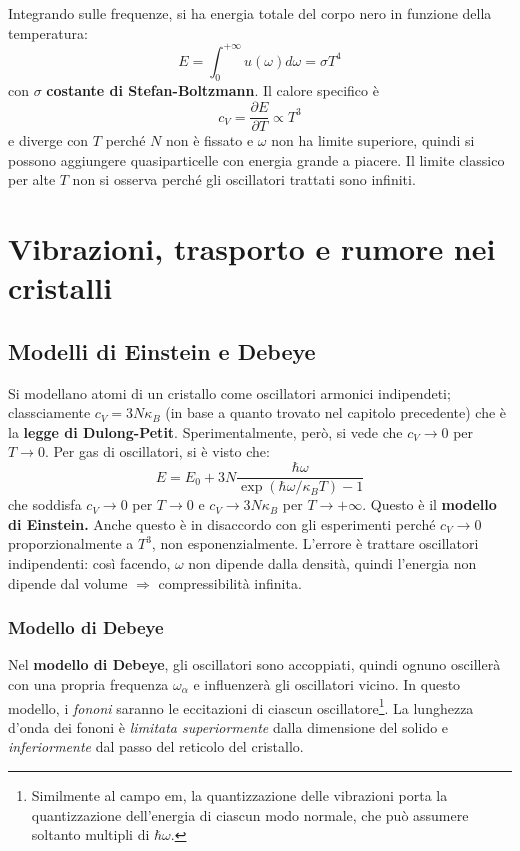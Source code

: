 \documentclass[10pt, a4paper]{scrartcl}
\numberwithin{equation}{subsection}
\theoremstyle{style1}
\theoremstyle{style2}
\begin{document}
Integrando sulle frequenze, si ha energia totale del corpo nero in funzione della temperatura:
\begin{equation}
	E = \int_{0} ^{+\infty} u(\omega) d\omega = \sigma T^4
\end{equation}
con $\sigma $ \textbf{costante di Stefan-Boltzmann}. Il calore specifico \`e 
\begin{equation}
	c_ V = \frac{\partial E}{\partial T} \propto T^3		
\end{equation}
e diverge con $T$  perch\'e $N$ non \`e fissato e $\omega$ non ha limite superiore, quindi si possono aggiungere quasiparticelle con energia grande a piacere. 
Il limite classico per alte $T$ non si osserva perch\'e gli oscillatori trattati sono infiniti.

\newpage

\section{Vibrazioni, trasporto e rumore nei cristalli}
\subsection{Modelli di Einstein e Debeye}
Si modellano atomi di un cristallo come oscillatori armonici indipendeti; classciamente $c_V = 3 N \kappa _B$ (in base a quanto trovato nel capitolo precedente)
che \`e la \textbf{legge di Dulong-Petit}.
Sperimentalmente, però, si vede che $c_V \to 0 $ per $T \to 0$.
Per gas di oscillatori, si \`e visto che:
\[
E = E_0 + 3N \frac{\hbar \omega}{\exp(\hbar \omega / \kappa _B T) -1 }
\] 
che soddisfa $c_V \to 0$ per $T \to 0$ e $c_V \to 3N \kappa _B $ per $T \to + \infty$. 
Questo \`e il \textbf{modello di Einstein.} 
Anche questo \`e in disaccordo con gli esperimenti perch\'e $c_V \to 0$ proporzionalmente a $T^3$, non esponenzialmente.
L'errore \`e trattare oscillatori indipendenti: cos\`i facendo, $\omega$ non dipende dalla densit\`a, quindi l'energia non dipende dal volume $\Rightarrow $ compressibilit\`a infinita.

\subsubsection{Modello di Debeye}
Nel \textbf{modello di Debeye}, gli oscillatori sono accoppiati, quindi ognuno osciller\`a con una propria frequenza $\omega_\alpha $ e influenzer\`a gli oscillatori vicino. 
In questo modello, i \textit{fononi} saranno le eccitazioni di ciascun oscillatore\footnote{Similmente al campo em, la quantizzazione delle vibrazioni porta la quantizzazione dell'energia di ciascun modo normale, che pu\`o assumere soltanto multipli di $\hbar  \omega$.}.
La lunghezza d'onda dei fononi \`e \textit{limitata superiormente} dalla dimensione del solido e \textit{inferiormente} dal passo del reticolo del cristallo.
\end{document}
